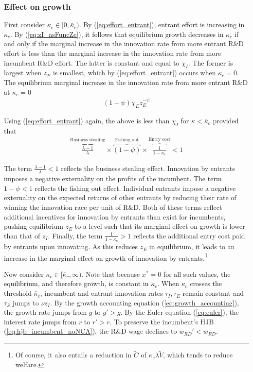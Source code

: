 \documentclass[12pt,english]{article}
\theoremstyle{remark}
\begin{document}
\subsubsection{Effect on growth}

First consider $\kappa_c \in [0, \bar{\kappa}_c)$. By (\ref{eq:effort_entrant}), entrant effort is increasing in $\kappa_c$. By (\ref{eq:zI_asFuncZe}), it follows that equilibrium growth decreases in $\kappa_c$ if and only if the marginal increase in the innovation rate from more entrant R\&D effort is less than the marginal increase in the innovation rate from more incumbent R\&D effort. The latter is constant and equal to $\chi_I$. The former is largest when $z_E$ is smallest, which by (\ref{eq:effort_entrant}) occurs when $\kappa_c = 0$. The equilibrium marginal increase in the innovation rate from more entrant R\&D at $\kappa_c = 0$
\begin{align}
	(1-\psi) \chi_E z_E^{-\psi} 
\end{align}

Using (\ref{eq:effort_entrant}) again, the above is less than $\chi_I$ for $\kappa < \bar{\kappa}_c$ provided that
\begin{align}
	\overbrace{\frac{\lambda-1}{\lambda}}^{\textrm{Business stealing}} \times \overbrace{(1-\psi)}^{\textrm{Fishing out}} \times  \overbrace{\frac{1}{1-\kappa_{e}}}^{\textrm{Entry cost}}< 1 \label{cs:growth_decreasing_condition}
\end{align}

The term $\frac{\lambda - 1}{\lambda} < 1$ reflects the business stealing effect. Innovation by entrants imposes a negative externality on the profits of the incumbent. The term $1-\psi < 1$ reflects the fishing out effect. Individual entrants impose a negative externality on the expected returns of other entrants by reducing their rate of winning the innovation race per unit of R\&D. Both of these terms reflect additional incentives for innovation by entrants than exist for incumbents, pushing equilibrium $z_E$ to a level such that its marginal effect on growth is lower than that of $z_I$. Finally, the term $\frac{1}{1-\kappa_e} > 1$ reflects the additional entry cost paid by entrants upon innovating. As this reduces $z_E$ in equilibrium, it leads to an increase in the marginal effect on growth of innovation by entrants.\footnote{Of course, it also entails a reduction in $\tilde{C}$ of $\kappa_e \lambda \tilde{V}$, which tends to reduce welfare.}

Now consider $\kappa_c \in [\bar{\kappa}_c,\infty)$. Note that because $x^* = 0$ for all such values, the equilibrium, and therefore growth, is constant in $\kappa_c$. When $\kappa_c$ crosses the threshold $\bar{\kappa}_c$, incumbent and entrant innovation rates $\tau_I,\tau_E$ remain constant and $\tau_S$ jumps to $\nu z_I$. By the growth accounting equation (\ref{eq:growth_accounting}), the growth rate jumps from $g$ to $g' > g$. By the Euler equation (\ref{eq:euler}), the interest rate jumps from $r$ to $r'>r$. To preserve the incumbent's HJB (\ref{eq:hjb_incumbent_noNCA}), the R\&D wage declines to $w_{RD}' < w_{RD}$.
\end{document}
